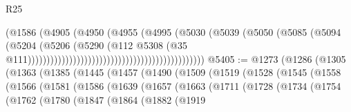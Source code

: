 \begin{lexlean}{R25}
\begin{coremodule}
{{{{{{{{{{{{{{{{{{{{{{{{{{{{{{{{{{{{{{{{{{{{{{{{{{{{{{{{{{{{{{{{{{{{{{{{{{{{{{{{{{{{{{{{{{{{{{{{{{{{{{{{{{{{{{{{{{{{{{{{{{{{{{{{{{{{{{{{{{{{{{{{{{{{{{{{{{{{{{{{{{{{{{{{{{{{{{{{{{{{{{{{{{{{{{{{{{{{{{{                                                                    (@1586
                                                                      (@4905
                                                                        (@4950
                                                                          (@4955
                                                                            (@4995
                                                                              (@5030
                                                                                (@5039
                                                                                  (@5050
                                                                                    (@5085
                                                                                      (@5094
                                                                                        (@5204
                                                                                          (@5206
                                                                                            (@5290
                                                                                              (@112
                                                                                                @5308
                                                                                                (@35
                                                                                                  @111)))))))))))))))))))))))))))))))))))))))))))))))
@5405 := @1273
    (@1286
      (@1305
        (@1363
          (@1385
            (@1445
              (@1457
                (@1490
                  (@1509
                    (@1519
                      (@1528
                        (@1545
                          (@1558
                            (@1566
                              (@1581
                                (@1586
                                  (@1639
                                    (@1657
                                      (@1663
                                        (@1711
                                          (@1728
                                            (@1734
                                              (@1754
                                                (@1762
                                                  (@1780
                                                    (@1847
                                                      (@1864
                                                        (@1882
                                                          (@1919
}}}}}}}}}}}}}}}}}}}}}}}}}}}}}}}}}}}}}}}}}}}}}}}}}}}}}}}}}}}}}}}}}}}}}}}}}}}}}}}}}}}}}}}}}}}}}}}}}}}}}}}}}}}}}}}}}}}}}}}}}}}}}}}}}}}}}}}}}}}}}}}}}}}}}}}}}}}}}}}}}}}}}}}}}}}}}}}}}}}}}}}}}}}}}}}}}}}}}}}
\end{coremodule}
\end{lexlean}
